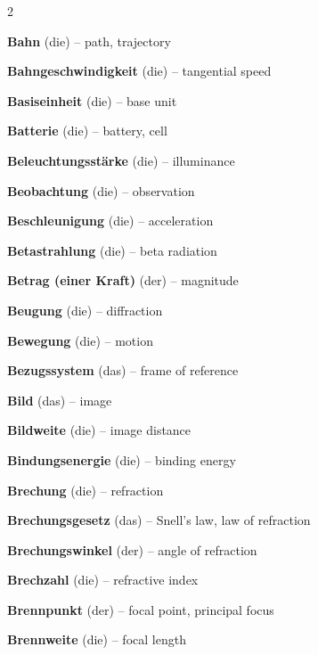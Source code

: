 \begin{multicols}{2}
\par\nopagebreak
\textbf{Bahn} (die) -- path, trajectory\dotfill\hyperref[e:33]{\pageref*{e:33}}\par
\textbf{Bahngeschwindigkeit} (die) -- tangential speed\dotfill\hyperref[e:55]{\pageref*{e:55}}\par
\textbf{Basiseinheit} (die) -- base unit\dotfill\hyperref[e:4]{\pageref*{e:4}}\par
\textbf{Batterie} (die) -- battery, cell\dotfill\hyperref[e:156]{\pageref*{e:156}}\par
\textbf{Beleuchtungsstärke} (die) -- illuminance\dotfill\hyperref[e:258]{\pageref*{e:258}}\par
\textbf{Beobachtung} (die) -- observation\dotfill\hyperref[e:18]{\pageref*{e:18}}\par
\textbf{Beschleunigung} (die) -- acceleration\dotfill\hyperref[e:40]{\pageref*{e:40}}\par
\textbf{Betastrahlung} (die) -- beta radiation\dotfill\hyperref[e:276]{\pageref*{e:276}}\par
\textbf{Betrag (einer Kraft)} (der) -- magnitude\dotfill\hyperref[e:61]{\pageref*{e:61}}\par
\textbf{Beugung} (die) -- diffraction\dotfill\hyperref[e:208]{\pageref*{e:208}}\par
\textbf{Bewegung} (die) -- motion\dotfill\hyperref[e:30]{\pageref*{e:30}}\par
\textbf{Bezugssystem} (das) -- frame of reference\dotfill\hyperref[e:32]{\pageref*{e:32}}\par
\textbf{Bild} (das) -- image\dotfill\hyperref[e:249]{\pageref*{e:249}}\par
\textbf{Bildweite} (die) -- image distance\dotfill\hyperref[e:247]{\pageref*{e:247}}\par
\textbf{Bindungsenergie} (die) -- binding energy\dotfill\hyperref[e:290]{\pageref*{e:290}}\par
\textbf{Brechung} (die) -- refraction\dotfill\hyperref[e:234]{\pageref*{e:234}}\par
\textbf{Brechungsgesetz} (das) -- Snell's law, law of refraction\dotfill\hyperref[e:237]{\pageref*{e:237}}\par
\textbf{Brechungswinkel} (der) -- angle of refraction\dotfill\hyperref[e:235]{\pageref*{e:235}}\par
\textbf{Brechzahl} (die) -- refractive index\dotfill\hyperref[e:236]{\pageref*{e:236}}\par
\textbf{Brennpunkt} (der) -- focal point, principal focus\dotfill\hyperref[e:244]{\pageref*{e:244}}\par
\textbf{Brennweite} (die) -- focal length\dotfill\hyperref[e:245]{\pageref*{e:245}}\par


\end{multicols}
